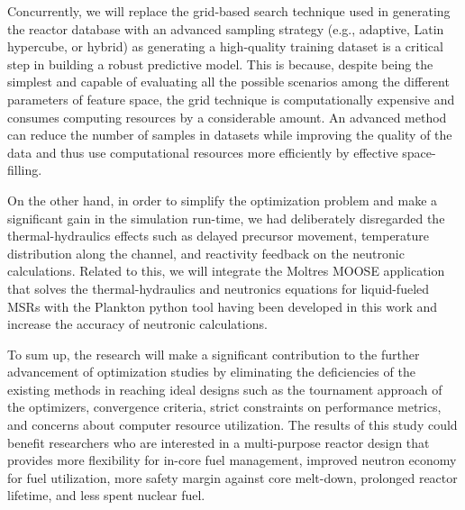     Concurrently, we will replace the grid-based search technique used in generating the reactor database with an advanced sampling strategy (e.g., adaptive, Latin hypercube, or hybrid) as generating a high-quality training dataset is a critical step in building a robust predictive model. This is because, despite being the simplest and capable of evaluating all the possible scenarios among the different parameters of feature space, the grid technique is computationally expensive and consumes computing resources by a considerable amount. An advanced method can reduce the number of samples in datasets while improving the quality of the data and thus use computational resources more efficiently by effective space-filling.

    On the other hand, in order to simplify the optimization problem and make a significant gain in the simulation run-time, we had deliberately disregarded the thermal-hydraulics effects such as delayed precursor movement, temperature distribution along the channel, and reactivity feedback on the neutronic calculations. Related to this, we will integrate the Moltres MOOSE application that solves the thermal-hydraulics and neutronics equations for liquid-fueled \gls{MSR}s with the Plankton python tool having been developed in this work and increase the accuracy of neutronic calculations.

    To sum up, the research will make a significant contribution to the further advancement of optimization studies by eliminating the deficiencies of the existing methods in reaching ideal designs such as the tournament approach of the optimizers, convergence criteria, strict constraints on performance metrics, and concerns about computer resource utilization. The results of this study could benefit researchers who are interested in a multi-purpose reactor design that provides more flexibility for in-core fuel management, improved neutron economy for fuel utilization, more safety margin against core melt-down, prolonged reactor lifetime, and less spent nuclear fuel.
